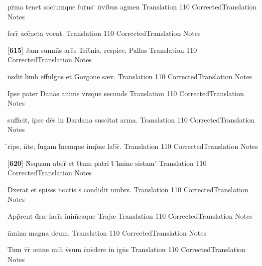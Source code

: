\latline
  {pr\={\macron {\i}}ma tenet sociumque fur\={}ns \={} n\={}vibus agmen}
  { Translation }
  {110}
  { CorrectedTranslation }
  { Notes }


\latline
  {ferr\={} acc\={\macron {\i}}ncta vocat.}
  { Translation }
  {110}
  { CorrectedTranslation }
  { Notes }


\latline
  {[\textbf{615}] Jam summ\={}s arc\={}s Trit\={}nia, respice, Pallas}
  { Translation }
  {110}
  { CorrectedTranslation }
  { Notes }


\latline
  {\={\macron {\i}}ns\={}dit limb\={} effulg\={}ns et Gorgone s{\ae}v\={}.}
  { Translation }
  {110}
  { CorrectedTranslation }
  { Notes }


\latline
  {Ipse pater Dana\={\macron {\i}}s anim\={}s v\={\macron {\i}}r\={\macron {\i}}sque secund\={}s}
  { Translation }
  {110}
  { CorrectedTranslation }
  { Notes }


\latline
  {sufficit, ipse de\={}s in Dardana suscitat arma.}
  { Translation }
  {110}
  { CorrectedTranslation }
  { Notes }


\latline
  {\={}ripe, n\={}te, fugam f\={\macron {\i}}nemque imp\={}ne lab\={}r\={\macron {\i}}.}
  { Translation }
  {110}
  { CorrectedTranslation }
  { Notes }


\latline
  {[\textbf{620}] N\={}squam aber\={} et t\={}tum patri\={} t\={} l\={\macron {\i}}mine sistam'}
  { Translation }
  {110}
  { CorrectedTranslation }
  { Notes }


\latline
  {D\={\macron {\i}}xerat et spiss\={\macron {\i}}s noctis s\={} condidit umbr\={\macron {\i}}s.}
  { Translation }
  {110}
  { CorrectedTranslation }
  { Notes }


\latline
  {App\={}rent d\={\macron {\i}}r{\ae} faci\={}s inim\={\macron {\i}}caque Traj{\ae}}
  { Translation }
  {110}
  { CorrectedTranslation }
  { Notes }


\latline
  {n\={}mina magna deum.}
  { Translation }
  {110}
  { CorrectedTranslation }
  { Notes }


\latline
  {Tum v\={}r\={} omne mih\={\macron {\i}} v\={\macron {\i}}sum c\={}ns\={\macron {\i}}dere in ign\={\macron {\i}}s}
  { Translation }
  {110}
  { CorrectedTranslation }
  { Notes }


